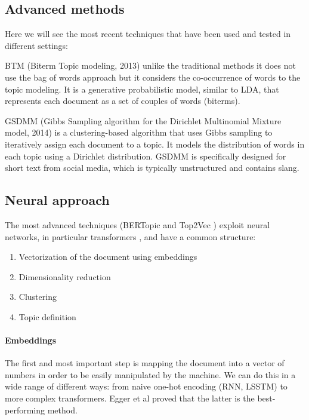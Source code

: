 \subsection{Advanced methods}
Here we will see the most recent techniques that have been used and tested in different settings:

BTM (Biterm Topic modeling, 2013) \cite{yan_biterm_2013} unlike the traditional methods it does not use the bag of words approach but it considers the co-occurrence of words to the topic modeling. It is a generative probabilistic model, similar to LDA, that represents each document as a set of couples of words (biterms).

GSDMM (Gibbs Sampling algorithm for the Dirichlet Multinomial Mixture model, 2014) \cite{yin_dirichlet_2014} is a clustering-based algorithm that uses Gibbs sampling to iteratively assign each document to a topic. It models the distribution of words in each topic using a Dirichlet distribution. GSDMM is specifically designed for short text from social media, which is typically unstructured and contains slang.

\subsection{Neural approach}

The most advanced techniques (BERTopic \cite{grootendorst_bertopic_2022}and Top2Vec \cite{angelov_top2vec_2020})  exploit neural networks, in particular transformers \cite{vaswani_attention_2017}, and have a common structure: 

\begin{enumerate}
    \item Vectorization of the document using embeddings
    \item Dimensionality reduction
    \item Clustering
    \item Topic definition
\end{enumerate}



\paragraph{Embeddings}

The first and most important step is mapping the document into a vector of numbers in order to be easily manipulated by the machine. We can do this in a wide range of different ways: from naive one-hot encoding (RNN, LSSTM) to more complex transformers. Egger et al \cite{egger_topic_2022} proved that the latter is the best-performing method.

